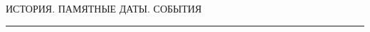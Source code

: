 \def\stat{sokolov}



\begin{center}

{\Large %



{\prgsh\LARGE

ИСТОРИЯ. ПАМЯТНЫЕ ДАТЫ. СОБЫТИЯ

}

\vskip 17pt

 \hrule

 \par


}

\end{center}



\vspace*{10pt}








\def\rightmark{\ }

\def\leftmark{\ }



\def\tit{\ }



\def\aut{\ }



\def\auf{\ }



\def\leftkol{\ } %



\def\rightkol{\ } %



\titele{\tit}{\aut}{\auf}{\leftkol}{\rightkol}



\label{st\stat}










 






